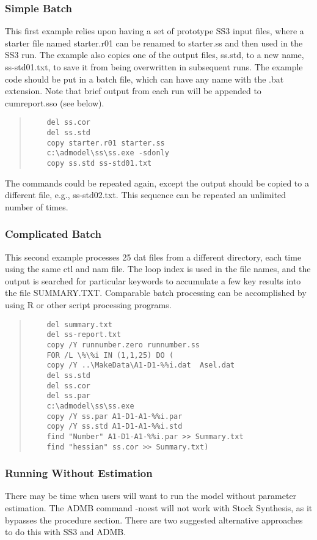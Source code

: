 \subsubsection{Simple Batch}

This first example relies upon having a set of prototype SS3 input files, where a starter file named starter.r01 can be renamed to starter.ss and then used in the SS3 run. The example also copies one of the output files, ss.std, to a new name, ss-std01.txt, to save it from being overwritten in subsequent runs. The example code should be put in a batch file, which can have any name with the .bat extension. Note that brief output from each run will be appended to cumreport.sso (see below).

\begin{quote}
	\begin{verbatim}
	del ss.cor
	del ss.std
	copy starter.r01 starter.ss
	c:\admodel\ss\ss.exe -sdonly
	copy ss.std ss-std01.txt
	\end{verbatim}
\end{quote}

The commands could be repeated again, except the output should be copied to a different file, e.g., ss-std02.txt. This sequence can be repeated an unlimited number of times.

\subsubsection{Complicated Batch}
This second example processes 25 dat files from a different directory, each time using the same ctl and nam file.  The loop index is used in the file names, and the output is searched for particular keywords to accumulate a few key results into the file SUMMARY.TXT.  Comparable batch processing can be accomplished by using R or other script processing programs.

\begin{quote}
	\begin{verbatim}
	del summary.txt
	del ss-report.txt
	copy /Y runnumber.zero runnumber.ss
	FOR /L \%\%i IN (1,1,25) DO (
	copy /Y ..\MakeData\A1-D1-%%i.dat  Asel.dat
	del ss.std
	del ss.cor
	del ss.par
	c:\admodel\ss\ss.exe
	copy /Y ss.par A1-D1-A1-%%i.par
	copy /Y ss.std A1-D1-A1-%%i.std
	find "Number" A1-D1-A1-%%i.par >> Summary.txt
	find "hessian" ss.cor >> Summary.txt)
	\end{verbatim}
\end{quote}

\hypertarget{NoEst}{}
\subsubsection{Running Without Estimation}
There may be time when users will want to run the model without parameter estimation. The ADMB command -noest will not work with Stock Synthesis, as it bypasses the procedure section. There are two suggested alternative approaches to do this with SS3 and ADMB.  

